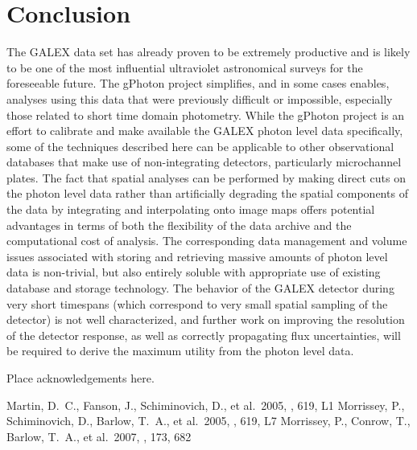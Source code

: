 \documentclass[preprint]{aastex}
\begin{document}
\section{Conclusion}
The GALEX data set has already proven to be extremely productive and is likely to be one of the most influential ultraviolet astronomical surveys for the foreseeable future. The gPhoton project simplifies, and in some cases enables, analyses using this data that were previously difficult or impossible, especially those related to short time domain photometry. While the gPhoton project is an effort to calibrate and make available the GALEX photon level data specifically, some of the techniques described here can be applicable to other observational databases that make use of non-integrating detectors, particularly microchannel plates. The fact that spatial analyses can be performed by making direct cuts on the photon level data rather than artificially degrading the spatial components of the data by integrating and interpolating onto image maps offers potential advantages in terms of both the flexibility of the data archive and the computational cost of analysis. The corresponding data management and volume issues associated with storing and retrieving massive amounts of photon level data is non-trivial, but also entirely soluble with appropriate use of existing database and storage technology. The behavior of the GALEX detector during very short timespans (which correspond to very small spatial sampling of the detector) is not well characterized, and further work on improving the resolution of the detector response, as well as correctly propagating flux uncertainties, will be required to derive the maximum utility from the photon level data.

\acknowledgements
Place acknowledgements here.

\begin{thebibliography}{}
 Martin, D.~C., Fanson, J., Schiminovich, D., et al.\ 2005, \apjl, 619, L1
 Morrissey, P., Schiminovich, D., Barlow, T.~A., et al.\ 2005, \apjl, 619, L7
 Morrissey, P., Conrow, T., Barlow, T.~A., et al.\ 2007, \apjs, 173, 682
\end{thebibliography}


\clearpage




\clearpage

\end{document}
